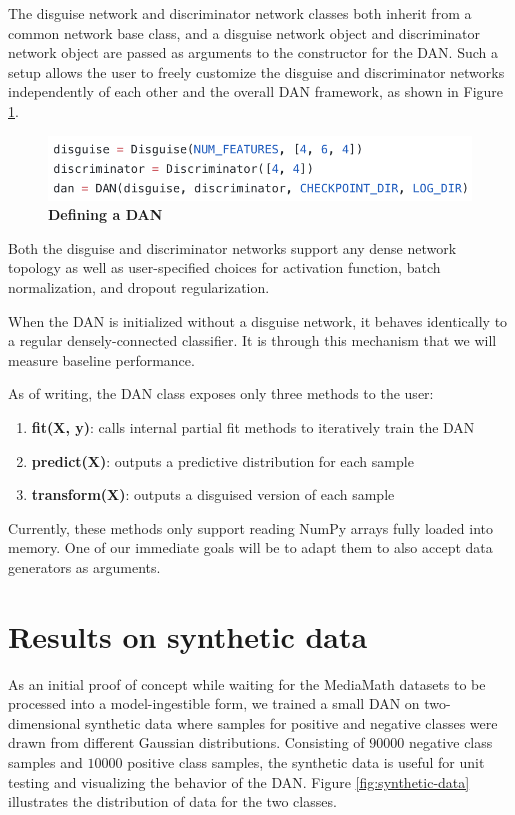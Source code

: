 \documentclass{proc}
\begin{document}
The disguise network and discriminator network classes both inherit from a common network base class, and a disguise network object and discriminator network object are passed as arguments to the constructor for the DAN. Such a setup allows the user to freely customize the disguise and discriminator networks independently of each other and the overall DAN framework, as shown in Figure \ref{fig:dan-usage}.

\begin{figure}[h!]
		\includegraphics*[scale=0.6]{../figures/dan-usage.png}
		\caption{\textbf{Defining a DAN}}
		\label{fig:dan-usage}
\end{figure}

Both the disguise and discriminator networks support any dense network topology as well as user-specified choices for activation function, batch normalization, and dropout regularization.

When the DAN is initialized without a disguise network, it behaves identically to a regular densely-connected classifier. It is through this mechanism that we will measure baseline performance.

As of writing, the DAN class exposes only three methods to the user:

\begin{enumerate}
\item{\textbf{fit(X, y)}}: calls internal partial fit methods to iteratively train the DAN
\item{\textbf{predict(X)}}: outputs a predictive distribution for each sample
\item{\textbf{transform(X)}}: outputs a disguised version of each sample
\end{enumerate}

Currently, these methods only support reading NumPy arrays fully loaded into memory. One of our immediate goals will be to adapt them to also accept data generators as arguments.

\section{Results on synthetic data}

As an initial proof of concept while waiting for the MediaMath datasets to be processed into a model-ingestible form, we trained a small DAN on two-dimensional synthetic data where samples for positive and negative classes were drawn from different Gaussian distributions. Consisting of $90000$ negative class samples and $10000$ positive class samples, the synthetic data is useful for unit testing and visualizing the behavior of the DAN. Figure \ref{fig:synthetic-data} illustrates the distribution of data for the two classes.
\end{document}
